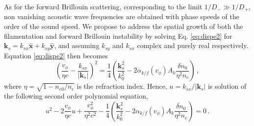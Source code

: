 \documentclass[
 reprint,
 amsmath,amssymb,
 aps,
]{revtex4-1}
\begin{document}
As for the forward Brillouin scattering,  corresponding to the limit $1/D_-\gg1/D_+$, non vanishing acoustic wave frequencies are obtained with  phase speeds of the order of the sound speed. We propose to address the spatial growth of both the filamentation and forward Brillouin instability  by solving Eq. \eqref{eq:dispe2} for  $\mathbf{k}_s = k_{sx} \hat{\mathbf{x}} +k_{sy} \hat{\mathbf{y}}$, and assuming 
$ k_{sy}$ and $k_{sx}$ complex and purely real   respectively. Equation \eqref{eq:dispe2} then becomes 
\begin{equation}\label{eq:dispe3} 
\left(\frac{v_\phi}{\eta c} - 
\frac{ k_{sx}}{\vert \mathbf{k}_s\vert }\right)^2
=\frac{1}{4} \left( \frac{\mathbf{k}_s^2}{k_0^2} - 2\alpha_{k/f}(v_\phi)A_k\frac{\delta n_0}{\eta^2n_c} \right) 
\, ,
\end{equation}
where $\eta=\sqrt{1-n_{e0}/n_c}$ is the refraction index.
Hence, $u =  k_{sx}/\vert \mathbf{k}_s\vert $ is solution of the following second order polynomial equation, 
\begin{equation}\label{eq:dispe2poly} 
u^2 -2\frac{v_\phi}{\eta c}u +\frac{v_\phi^2}{\eta^2 c^2}-\frac{1}{4}\left( \frac{\mathbf{k}_s^2}{k_0^2} - 2\alpha_{k/f}(v_\phi)A_k\frac{\delta n_0}{\eta^2n_c} \right) =0 
\, .
\end{equation}
\end{document}
